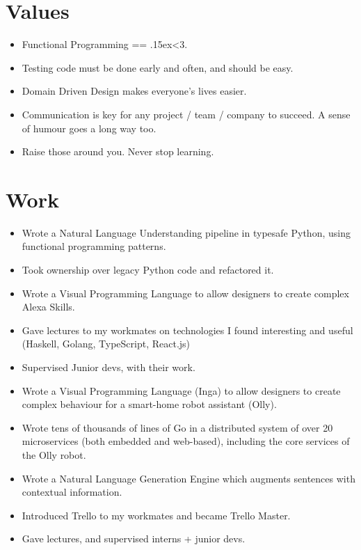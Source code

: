 \documentclass{jcgcv}
\begin{document}
\begin{column}



\section{Values}

\begin{itemize}
  \item Functional Programming == {\raise.15ex\hbox{<}}3.
  \item Testing code must be done early and often, and should be easy.
  \item Domain Driven Design makes everyone's lives easier.
  \item Communication is key for any project / team / company to succeed. A sense of humour goes a long way too.
  \item Raise those around you. Never stop learning.
\end{itemize}



\section{Work}

\begin{itemize}
  \item Wrote a Natural Language Understanding pipeline in typesafe Python, using functional programming patterns.
  \item Took ownership over legacy Python code and refactored it.
  \item Wrote a Visual Programming Language to allow designers to create complex Alexa Skills.
  \item Gave lectures to my workmates on technologies I found interesting and useful (Haskell, Golang, TypeScript, React.js)
  \item Supervised Junior devs, with their work.
\end{itemize}

\begin{itemize}
  \item Wrote a Visual Programming Language (Inga) to allow designers to create complex behaviour for a smart-home robot assistant (Olly).
  \item Wrote tens of thousands of lines of Go in a distributed system of over 20 microservices (both embedded and web-based), including the core services of the Olly robot.
  \item Wrote a Natural Language Generation Engine which augments sentences with contextual information.
  \item Introduced Trello to my workmates and became Trello Master.
  \item Gave lectures, and supervised interns + junior devs.
\end{itemize}


\end{column}
\end{document}
